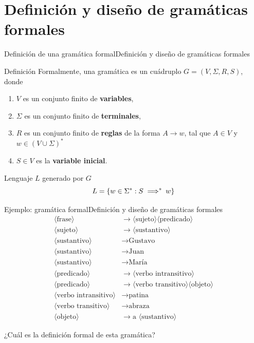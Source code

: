 \documentclass[spanish]{beamer}
\begin{document}
\section{Definición y diseño de gramáticas formales}

\begin{frame}{Definición de una gramática formal}{Definición y diseño de gramáticas formales}
    
    \begin{block}{Definición}
        Formalmente, una \alert{gramática} es un cuádruplo $G = (V, \Sigma, R, S)$, donde \pause

        \begin{enumerate}
            \itemsep1.5ex
            \item $V$ es un conjunto finito de \textbf{variables}, \pause
            \item $\Sigma$ es un conjunto finito de \textbf{terminales}, \pause
            \item $R$ es un conjunto finito de \textbf{reglas} de la forma $A \to w$, tal que $A \in V$ y $w \in (V \cup \Sigma)^*$ \pause
            \item $S \in V$ es la \textbf{variable inicial}.
        \end{enumerate}
        
    \end{block}

    \begin{exampleblock}{Lenguaje $L$ generado por $G$}
        \[L = \{w \in \Sigma^* : S \implies\mkern-10mu ^{*} \enspace w\}\]
    \end{exampleblock}
\end{frame}

\begin{frame}{Ejemplo: gramática formal}{Definición y diseño de gramáticas formales}
    \begin{align*}
        \langle \text{frase} \rangle & \to \langle \text{sujeto} \rangle \langle \text{predicado} \rangle\\
        \langle \text{sujeto} \rangle & \to \langle \text{sustantivo} \rangle\\
        \langle \text{sustantivo} \rangle & \to \text{Gustavo}\\
        \langle \text{sustantivo} \rangle & \to \text{Juan}\\
        \langle \text{sustantivo} \rangle & \to \text{María}\\
        \langle \text{predicado} \rangle & \to \langle \text{verbo intransitivo} \rangle\\
        \langle \text{predicado} \rangle & \to \langle \text{verbo transitivo} \rangle \langle \text{objeto}\rangle\\
        \langle \text{verbo intransitivo} \rangle & \to \text{patina}\\
        \langle \text{verbo transitivo} \rangle & \to \text{abraza}\\
        \langle \text{objeto} \rangle & \to \text{a } \langle \text{sustantivo} \rangle
    \end{align*}

    {\large ¿Cuál es la definición formal de esta gramática?}
\end{frame}
\end{document}
